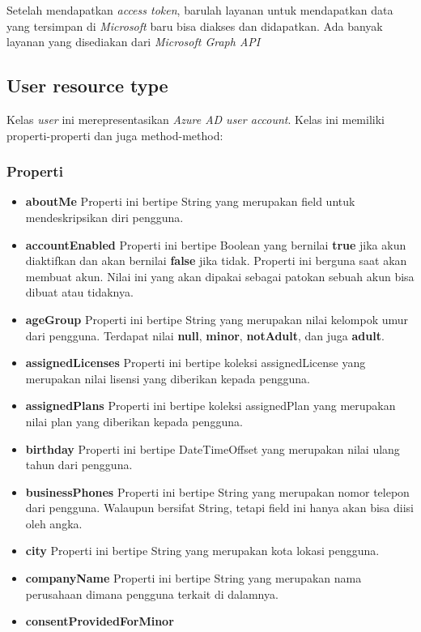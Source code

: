 Setelah mendapatkan \textit{access token}, barulah layanan untuk mendapatkan data yang tersimpan di \textit{Microsoft} baru bisa diakses dan didapatkan. Ada banyak layanan yang disediakan dari \textit{Microsoft Graph API} 

\subsection{User resource type}
Kelas \textit{user} ini merepresentasikan \textit{Azure AD user account}. Kelas ini memiliki properti-properti dan juga method-method:\\
\subsubsection{Properti}
\begin{itemize}
	\item \textbf{aboutMe}
	Properti ini bertipe String yang merupakan field untuk mendeskripsikan diri pengguna. 
	\item \textbf{accountEnabled}
	Properti ini bertipe Boolean yang bernilai \textbf{true} jika akun diaktifkan dan akan bernilai \textbf{false} jika tidak. Properti ini berguna saat akan membuat akun. Nilai ini yang akan dipakai sebagai patokan sebuah akun bisa dibuat atau tidaknya. 
	\item \textbf{ageGroup}
	Properti ini bertipe String yang merupakan nilai kelompok umur dari pengguna. Terdapat nilai \textbf{null}, \textbf{minor}, \textbf{notAdult}, dan juga \textbf{adult}.
	\item \textbf{assignedLicenses}
	Properti ini bertipe koleksi assignedLicense yang merupakan nilai lisensi yang diberikan kepada pengguna.
	\item \textbf{assignedPlans}
	Properti ini bertipe koleksi assignedPlan yang merupakan nilai plan yang diberikan kepada pengguna.
	\item \textbf{birthday}
	Properti ini bertipe DateTimeOffset yang merupakan nilai ulang tahun dari pengguna. 
	\item \textbf{businessPhones}
	Properti ini bertipe String yang merupakan nomor telepon dari pengguna. Walaupun bersifat String, tetapi field ini hanya akan bisa diisi oleh angka.
	\item \textbf{city}
	Properti ini bertipe String yang merupakan kota lokasi pengguna.
	\item \textbf{companyName}
	Properti ini bertipe String yang merupakan nama perusahaan dimana pengguna terkait di dalamnya.
	\item \textbf{consentProvidedForMinor}

\end{itemize}
